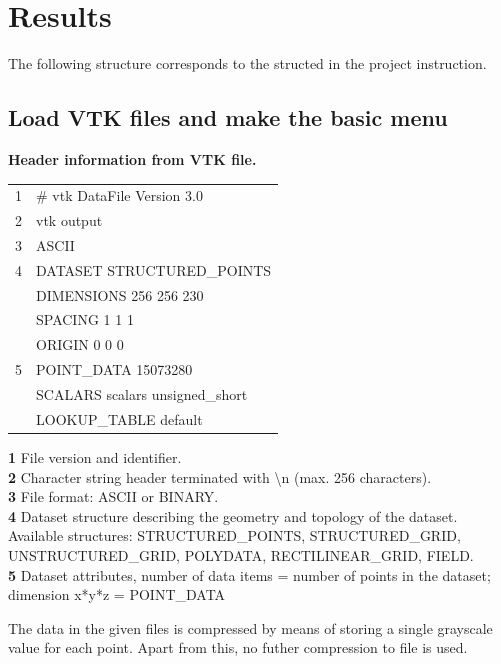 \chapter{Results}
The following structure corresponds to the structed in the project instruction.


\section{Load VTK files and make the basic menu} 

\textbf{Header information from VTK file.}

\begin{table}[h]
	\ttfamily
	\small
	\begin{tabular}{l|l}
		1 & \# vtk DataFile Version 3.0     \\
		2 & vtk output                      \\
		3 & ASCII                           \\
		4 & DATASET STRUCTURED\_POINTS      \\
		& DIMENSIONS 256 256 230          \\
		& SPACING 1 1 1                   \\
		& ORIGIN 0 0 0                    \\
		5 & POINT\_DATA 15073280            \\
		& SCALARS scalars unsigned\_short \\
		& LOOKUP\_TABLE default          
	\end{tabular}
\end{table}

\noindent
\textbf{1} File version and identifier.\\
\textbf{2} Character string header terminated with \textbackslash n (max. 256 characters).\\
\textbf{3} File format: ASCII or BINARY.\\
\textbf{4} Dataset structure describing the geometry and topology of the dataset. Available structures: STRUCTURED\_POINTS, STRUCTURED\_GRID, UNSTRUCTURED\_GRID, POLYDATA, RECTILINEAR\_GRID, FIELD.\\
\textbf{5} Dataset attributes, number of data items = number of points in the dataset; dimension x*y*z = POINT\_DATA

The data in the given files is compressed by means of storing a single grayscale value for each point. Apart from this, no futher compression to file is used.

